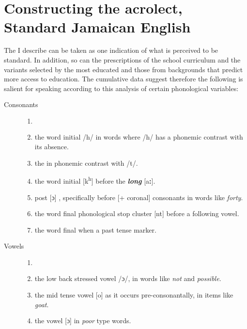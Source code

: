 \section{Constructing the acrolect, Standard Jamaican English}\label{sec:3.6}

The  I describe can be taken as one indication of what is perceived to be standard.  In addition, so can the prescriptions of the school curriculum and the variants selected by the most educated and those from backgrounds that predict more access to education.  The cumulative data suggest therefore the following is salient for speaking  according to this analysis of certain phonological variables:

\begin{description}
\item[Consonants]
    \begin{enumerate}[label=\alph*)]
        \item[]
        \item the word initial  /h/ in words where /h/ has a phonemic contrast with its absence.
        \item the  in phonemic contrast with /t/. 
        \item the word initial  [k\textsuperscript{h}] before the \textbf{\textit{long}}  [a\textbf{:}].
        \item post [ɔ] , specifically before [+ coronal] consonants in words like \textit{forty}.
        \item the word final phonological stop cluster [nt] before a following vowel. 
        \item the word final  when a past tense marker.
    \end{enumerate}
\item[Vowels]
    \begin{enumerate}[resume*]
        \item[]
        \item the low back stressed vowel /ɔ/, in words like \textit{not} and \textit{possible}.  
        \item the mid tense vowel [o] as it occurs pre-consonantally, in items like \textit{goat}.
        \item the vowel [ɔ] in \textit{poor} type words. 
    \end{enumerate}
\end{description}    

